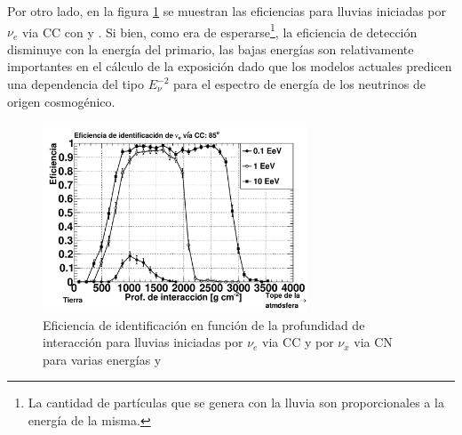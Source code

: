 	Por otro lado, en la figura \ref{fig:effDG_en} se muestran las eficiencias para lluvias iniciadas por $\nu_e$ via CC con  y .
	Si bien, como era de esperarse\footnote{La cantidad de partículas que se genera con la lluvia son proporcionales a la energía de la misma.}, la eficiencia de detección disminuye con la energía del primario, las bajas energías son relativamente importantes en el cálculo de la exposición dado que los modelos actuales predicen una dependencia del tipo $E_\nu^{-2}$ para el espectro de energía de los neutrinos de origen cosmogénico.
	\begin{figure}[h!]
		\begin{center}
			\includegraphics[width=0.7\textwidth]{fig/resultadosAuger/eff_varios_85}
			\caption{Eficiencia de identificación en función de la profundidad de interacción para lluvias iniciadas por $\nu_e$ via CC y por $\nu_x$ via CN para varias energías y }
			\label{fig:effDG_en}
		\end{center}
	\end{figure}
	

